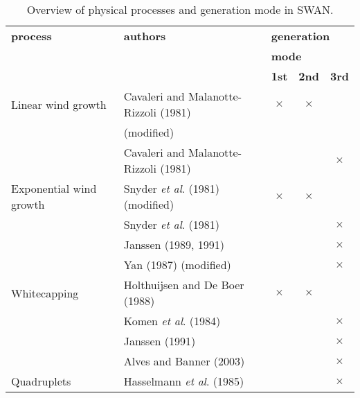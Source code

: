 \documentclass[12pt]{book}
\begin{document}
\begin{table}[htb]
\begin{center}
\caption{Overview of physical processes and generation mode in SWAN.}
\label{tab:ovmod}
\begin{tabular}{|l | l | c | c | c|}
\hline
  \multicolumn{1}{|l|}{{\bf process}}&
  \multicolumn{1}{|l|}{{\bf authors}}&
  \multicolumn{3}{|l|}{{\bf generation}}\\
  \multicolumn{1}{|l|}{}&
  \multicolumn{1}{|l|}{}&
  \multicolumn{3}{|l|}{{\bf mode}}\\
\cline{3-5}
  \multicolumn{1}{|l|}{}&
  \multicolumn{1}{|l|}{}&
  \multicolumn{1}{|c|}{{\bf 1st}}&
  \multicolumn{1}{|c|}{{\bf 2nd}}&
  \multicolumn{1}{|c|}{{\bf 3rd}}\\
\hline
\hline
Linear wind growth      & Cavaleri and Malanotte-Rizzoli (1981)  & $\times$ & $\times$ &          \\
                        & (modified)                             &          &          &          \\
\cline{2-5}
                        & Cavaleri and Malanotte-Rizzoli (1981)  &          &          & $\times$ \\
\hline
Exponential wind growth & Snyder {\it et al}. (1981) (modified)  & $\times$ & $\times$ &          \\
\cline{2-5}
                        & Snyder {\it et al}. (1981)             &          &          & $\times$ \\
\cline{2-5}
                        & Janssen (1989, 1991)                   &          &          & $\times$ \\
\cline{2-5}
                        & Yan (1987) (modified)                  &          &          & $\times$ \\
\hline
Whitecapping            & Holthuijsen and De Boer (1988)         & $\times$ & $\times$ &          \\
\cline{2-5}
                        & Komen {\it et al}. (1984)              &          &          & $\times$ \\
\cline{2-5}
                        & Janssen (1991)                         &          &          & $\times$ \\
\cline{2-5}
                        & Alves and Banner (2003)                &          &          & $\times$ \\
\hline
Quadruplets             & Hasselmann {\it et al}. (1985)         &          &          & $\times$ \\
\hline

\end{tabular}
\end{center}
\end{table}
\end{document}
